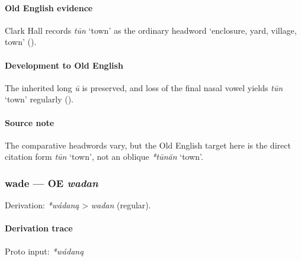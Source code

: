 \documentclass[
  british,
  a4paper,
]{article}
\providecommand{\Recon}[1]{\emph{*#1}}
\begin{document}
\paragraph{Old English evidence}\label{old-english-evidence-63}

Clark Hall records \emph{tūn} `town' as the ordinary headword
`enclosure, yard, village, town' ().

\paragraph{Development to Old
English}\label{development-to-old-english-63}

The inherited long \emph{ū} is preserved, and loss of the final nasal
vowel yields \emph{tūn} `town' regularly
().

\paragraph{Source note}\label{source-note-6}

The comparative headwords vary, but the Old English target here is the
direct citation form \emph{tūn} `town', not an oblique \Recon{tūnăn}
`town'.

\subsubsection{\texorpdfstring{wade --- OE
\emph{wadan}}{wade --- OE wadan}}\label{wade-oe-wadan}

Derivation: \emph{*wádaną} \textgreater{} \emph{wadan} (regular).

\paragraph{Derivation trace}\label{derivation-trace-68}

Proto input: \emph{*wádaną}

\begingroup
\setlength{\fboxsep}{6pt}
\end{document}
